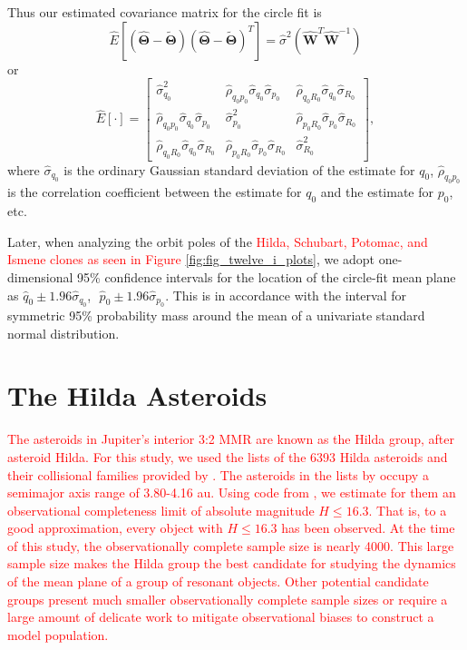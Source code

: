\documentclass[a4paper,fleqn]{cas-sc}
\begin{document}
\begin{linenumbers}
Thus our estimated covariance matrix for the circle fit is
\begin{equation}
\hat{E}[(\hat{\mathbf{\Theta}}-\tilde{\mathbf{\Theta}})(\hat{\mathbf{\Theta}}-\tilde{\mathbf{\Theta}})^T]=\hat{\sigma}^2(\mathbf{\hat{W}}^T\mathbf{\hat{W}}^{-1})
\end{equation}
or
\begin{equation}
\hat{E}[\cdot]=
\begin{bmatrix}
\hat{\sigma}_{q_0}^2 & \hat{\rho}_{q_0p_0}\hat{\sigma}_{q_0}\hat{\sigma}_{p_0} &  
\hat{\rho}_{q_0R_0}\hat{\sigma}_{q_0}\hat{\sigma}_{R_0}\\
\hat{\rho}_{q_0p_0}\hat{\sigma}_{q_0}\hat{\sigma}_{p_0} & \hat{\sigma}_{p_0}^2 &  \hat{\rho}_{p_0R_0}\hat{\sigma}_{p_0}\hat{\sigma}_{R_0}\\
\hat{\rho}_{q_0R_0}\hat{\sigma}_{q_0}\hat{\sigma}_{R_0} & \hat{\rho}_{p_0R_0}\hat{\sigma}_{p_0}\hat{\sigma}_{R_0} & \hat{\sigma}_{R_0}^2
\end{bmatrix},
\end{equation}
where $\hat{\sigma}_{q_0}$ is the ordinary Gaussian standard deviation of the estimate for $q_0$, $\hat{\rho}_{q_0p_0}$ is the correlation coefficient between the estimate for $q_0$ and the estimate for $p_0$, etc.


Later, when analyzing the orbit poles of the \textcolor{red}{Hilda, Schubart, Potomac, and Ismene clones as seen in Figure \ref{fig:fig_twelve_i_plots}}, we adopt one-dimensional 95\% confidence intervals for the location of the circle-fit mean plane as $\hat{q}_0\pm1.96\hat{\sigma}_{q_0}$, \,\,$\hat{p}_0\pm1.96\hat{\sigma}_{p_0}$.
This is in accordance with the interval for symmetric 95\% probability mass around the mean of a univariate standard normal distribution.






\section{The Hilda Asteroids}
\label{s:hildas}

\textcolor{red}{
The asteroids in Jupiter's interior 3:2 MMR are known as the Hilda group, after asteroid Hilda.
For this study, we used the lists of the \textcolor{red}{6393} Hilda asteroids and their collisional families provided by \citet{vokrouhlicky2025orbital}.
The asteroids in the lists by \citet{vokrouhlicky2025orbital}
occupy a semimajor axis range of 3.80-4.16 au.
Using code from \citep{hendler2020observational}, we estimate for them an observational completeness limit of absolute magnitude $H\leq16.3$.
That is, to a good approximation, every object with \textcolor{red}{$H\leq16.3$} has been observed.
At the time of this study, the observationally complete sample size is \textcolor{red}{nearly 4000}.
This large sample size makes the Hilda group the best candidate for studying the dynamics of the mean plane of a group of resonant objects.
Other potential candidate groups present much smaller observationally complete sample sizes or require a large amount of delicate work to mitigate observational biases to construct a model population.
}


\end{linenumbers}
\end{document}
